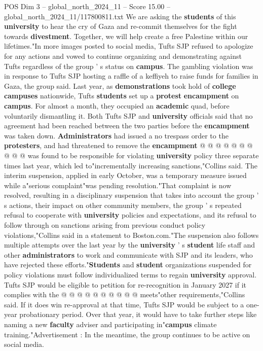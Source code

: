 \begin{textsample}{POS Dim 3 – global\_north\_2024\_11 – Score 15.00 – global\_north\_2024\_11/117800811.txt}
We are asking the \textbf{students} of this \textbf{university} to hear the cry of Gaza and re-commit themselves for the fight towards \textbf{divestment}.
Together, we will help create a free Palestine within our lifetimes."In more images posted to social media, Tufts SJP refused to apologize for any actions and vowed to continue organizing and demonstrating against Tufts regardless of the group ' s status on \textbf{campus}.
The gambling violation was in response to Tufts SJP hosting a raffle of a keffiyeh to raise funds for families in Gaza, the group said.
Last year, as \textbf{demonstrations} took hold of \textbf{college} \textbf{campuses} nationwide, Tufts \textbf{students} set up a \textbf{protest} \textbf{encampment} on \textbf{campus}.
For almost a month, they occupied an \textbf{academic} quad, before voluntarily dismantling it.
Both Tufts SJP and \textbf{university} officials said that no agreement had been reached between the two parties before the \textbf{encampment} was taken down. \textbf{Administrators} had issued a no trespass order to the \textbf{protesters}, and had threatened to remove the \textbf{encampment} @ @ @ @ @ @ @ @ @ @ was found to be responsible for violating \textbf{university} policy three separate times last year, which led to"incrementally increasing sanctions,"Collins said.
The interim suspension, applied in early October, was a temporary measure issued while a"serious complaint"was pending resolution."That complaint is now resolved, resulting in a disciplinary suspension that takes into account the group ' s actions, their impact on other community members, the group ' s repeated refusal to cooperate with \textbf{university} policies and expectations, and its refusal to follow through on sanctions arising from previous conduct policy violations,"Collins said in a statement to Boston.com."The suspension also follows multiple attempts over the last year by the \textbf{university} ' s \textbf{student} life staff and other \textbf{administrators} to work and communicate with SJP and its leaders, who have rejected these efforts."\textbf{Students} and \textbf{student} organizations suspended for policy violations must follow individualized terms to regain \textbf{university} approval.
Tufts SJP would be eligible to petition for re-recognition in January 2027 if it complies with the @ @ @ @ @ @ @ @ @ @ meets"other requirements,"Collins said.
If it does win re-approval at that time, Tufts SJP would be subject to a one-year probationary period.
Over that year, it would have to take further steps like naming a new \textbf{faculty} adviser and participating in"\textbf{campus} climate training."Advertisement : In the meantime, the group continues to be active on social media.

\end{textsample}
